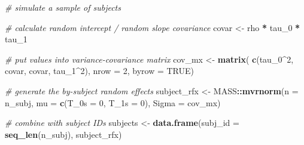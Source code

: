\documentclass[
  english,
  doc,floatsintext]{apa6}
\newenvironment{Shaded}{\begin{snugshade}}{\end{snugshade}}
\newcommand{\CommentTok}[1]{\textcolor[rgb]{0.56,0.35,0.01}{\textit{#1}}}
\newcommand{\DataTypeTok}[1]{\textcolor[rgb]{0.13,0.29,0.53}{#1}}
\newcommand{\DecValTok}[1]{\textcolor[rgb]{0.00,0.00,0.81}{#1}}
\newcommand{\KeywordTok}[1]{\textcolor[rgb]{0.13,0.29,0.53}{\textbf{#1}}}
\newcommand{\NormalTok}[1]{#1}
\newcommand{\OperatorTok}[1]{\textcolor[rgb]{0.81,0.36,0.00}{\textbf{#1}}}
\newcommand{\OtherTok}[1]{\textcolor[rgb]{0.56,0.35,0.01}{#1}}
\newcommand{\StringTok}[1]{\textcolor[rgb]{0.31,0.60,0.02}{#1}}
\begin{document}
\begin{Shaded}
\begin{Highlighting}[]
\CommentTok{# simulate a sample of subjects}

\CommentTok{# calculate random intercept / random slope covariance}
\NormalTok{covar <-}\StringTok{ }\NormalTok{rho }\OperatorTok{*}\StringTok{ }\NormalTok{tau_}\DecValTok{0} \OperatorTok{*}\StringTok{ }\NormalTok{tau_}\DecValTok{1}

\CommentTok{# put values into variance-covariance matrix}
\NormalTok{cov_mx  <-}\StringTok{ }\KeywordTok{matrix}\NormalTok{(}
  \KeywordTok{c}\NormalTok{(tau_}\DecValTok{0}\OperatorTok{^}\DecValTok{2}\NormalTok{, covar,}
\NormalTok{    covar,   tau_}\DecValTok{1}\OperatorTok{^}\DecValTok{2}\NormalTok{),}
  \DataTypeTok{nrow =} \DecValTok{2}\NormalTok{, }\DataTypeTok{byrow =} \OtherTok{TRUE}\NormalTok{)}

\CommentTok{# generate the by-subject random effects}
\NormalTok{subject_rfx <-}\StringTok{ }\NormalTok{MASS}\OperatorTok{::}\KeywordTok{mvrnorm}\NormalTok{(}\DataTypeTok{n =}\NormalTok{ n_subj,}
                             \DataTypeTok{mu =} \KeywordTok{c}\NormalTok{(}\DataTypeTok{T_0s =} \DecValTok{0}\NormalTok{, }\DataTypeTok{T_1s =} \DecValTok{0}\NormalTok{),}
                             \DataTypeTok{Sigma =}\NormalTok{ cov_mx)}

\CommentTok{# combine with subject IDs}
\NormalTok{subjects <-}\StringTok{ }\KeywordTok{data.frame}\NormalTok{(}\DataTypeTok{subj_id =} \KeywordTok{seq_len}\NormalTok{(n_subj),}
\NormalTok{                       subject_rfx)}
\end{Highlighting}
\end{Shaded}
\end{document}
